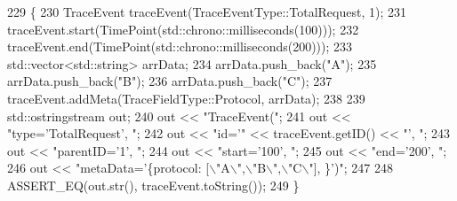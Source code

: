 \begin{DoxyCode}
229                                                \{
230   TraceEvent traceEvent(TraceEventType::TotalRequest, 1);
231   traceEvent.start(TimePoint(std::chrono::milliseconds(100)));
232   traceEvent.end(TimePoint(std::chrono::milliseconds(200)));
233   std::vector<std::string> arrData;
234   arrData.push\_back(\textcolor{stringliteral}{"A"});
235   arrData.push\_back(\textcolor{stringliteral}{"B"});
236   arrData.push\_back(\textcolor{stringliteral}{"C"});
237   traceEvent.addMeta(TraceFieldType::Protocol, arrData);
238 
239   std::ostringstream out;
240   out << \textcolor{stringliteral}{"TraceEvent("};
241   out << \textcolor{stringliteral}{"type='TotalRequest', "};
242   out << \textcolor{stringliteral}{"id='"} << traceEvent.getID() << \textcolor{stringliteral}{"', "};
243   out << \textcolor{stringliteral}{"parentID='1', "};
244   out << \textcolor{stringliteral}{"start='100', "};
245   out << \textcolor{stringliteral}{"end='200', "};
246   out << \textcolor{stringliteral}{"metaData='\{protocol: [\(\backslash\)"A\(\backslash\)",\(\backslash\)"B\(\backslash\)",\(\backslash\)"C\(\backslash\)"], \}')"};
247 
248   ASSERT\_EQ(out.str(), traceEvent.toString());
249 \}
\end{DoxyCode}
